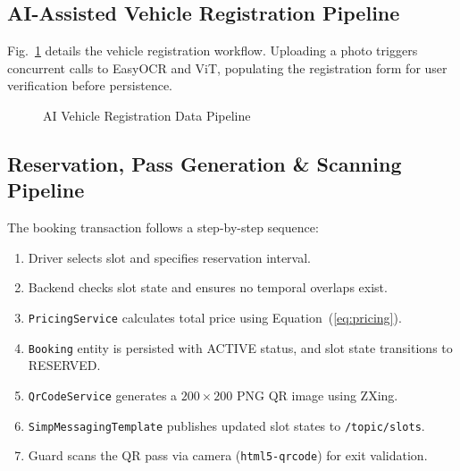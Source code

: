 \documentclass[conference,10pt]{IEEEtran}
\begin{document}
\subsection{AI-Assisted Vehicle Registration Pipeline}

Fig.~\ref{fig:veh_flow} details the vehicle registration workflow. Uploading a photo triggers concurrent calls to EasyOCR and ViT, populating the registration form for user verification before persistence.

\begin{figure}[ht]
\centering
{}
\caption{AI Vehicle Registration Data Pipeline}
\label{fig:veh_flow}
\end{figure}

\subsection{Reservation, Pass Generation \& Scanning Pipeline}

The booking transaction follows a step-by-step sequence:
\begin{enumerate}[leftmargin=*]
    \item Driver selects slot and specifies reservation interval.
    \item Backend checks slot state and ensures no temporal overlaps exist.
    \item \texttt{PricingService} calculates total price using Equation~(\ref{eq:pricing}).
    \item \texttt{Booking} entity is persisted with ACTIVE status, and slot state transitions to RESERVED.
    \item \texttt{QrCodeService} generates a $200\times200$ PNG QR image using ZXing.
    \item \texttt{SimpMessagingTemplate} publishes updated slot states to \texttt{/topic/slots}.
    \item Guard scans the QR pass via camera (\texttt{html5-qrcode}) for exit validation.
\end{enumerate}
\end{document}
